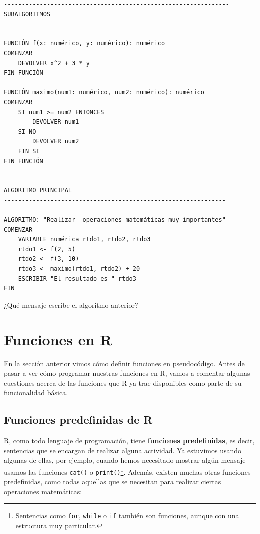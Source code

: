 \documentclass[
]{book}
\begin{document}
\begin{verbatim}
---------------------------------------------------------------
SUBALGORITMOS
---------------------------------------------------------------

FUNCIÓN f(x: numérico, y: numérico): numérico
COMENZAR
    DEVOLVER x^2 + 3 * y
FIN FUNCIÓN

FUNCIÓN maximo(num1: numérico, num2: numérico): numérico
COMENZAR
    SI num1 >= num2 ENTONCES
        DEVOLVER num1
    SI NO
        DEVOLVER num2
    FIN SI
FIN FUNCIÓN

--------------------------------------------------------------
ALGORITMO PRINCIPAL
--------------------------------------------------------------

ALGORITMO: "Realizar  operaciones matemáticas muy importantes"
COMENZAR
    VARIABLE numérica rtdo1, rtdo2, rtdo3
    rtdo1 <- f(2, 5)
    rtdo2 <- f(3, 10)
    rtdo3 <- maximo(rtdo1, rtdo2) + 20
    ESCRIBIR "El resultado es " rtdo3
FIN
\end{verbatim}

¿Qué mensaje escribe el algoritmo anterior?

\hypertarget{funciones-en-r}{%
\section{Funciones en R}\label{funciones-en-r}}

En la sección anterior vimos cómo definir funciones en pseudocódigo. Antes de pasar a ver cómo programar nuestras funciones en R, vamos a comentar algunas cuestiones acerca de las funciones que R ya trae disponibles como parte de su funcionalidad básica.

\hypertarget{funcpredef}{%
\subsection{Funciones predefinidas de R}\label{funcpredef}}

R, como todo lenguaje de programación, tiene \textbf{funciones predefinidas}, es decir, sentencias que se encargan de realizar alguna actividad. Ya estuvimos usando algunas de ellas, por ejemplo, cuando hemos necesitado mostrar algún mensaje usamos las funciones \texttt{cat()} o \texttt{print()}\footnote{Sentencias como \texttt{for}, \texttt{while} o \texttt{if} también son funciones, aunque con una estructura muy particular.}. Además, existen muchas otras funciones predefinidas, como todas aquellas que se necesitan para realizar ciertas operaciones matemáticas:
\end{document}
